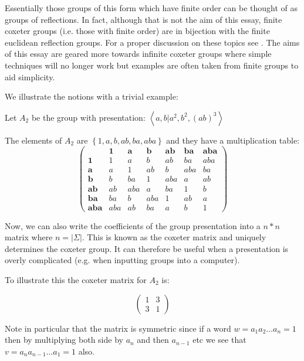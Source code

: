 \documentclass[a4paper,12pt]{article}
\begin{document}
Essentially those groups of this form which have finite order can be thought of as groups of reflections. In fact, although that is not the aim of this essay, finite coxeter groups (i.e. those with finite order) are in bijection with the finite euclidean reflection groups. For a proper discussion on these topics see \cite{humphreys90}. The aims of this essay are geared more towards infinite coxeter groups where simple techniques will no longer work but examples are often taken from finite groups to aid simplicity.

We illustrate the notions with a trivial example:

\begin{example}
Let $A_2$ be the group with presentation: $\left\langle a, b | a^2, b^2, (ab)^3\right\rangle$

The elements of $A_2$ are $\left\{1, a, b, ab, ba, aba\right\}$ and they have a multiplication table:
\[ \left( \begin{array}{ccccccc}
	    & \textbf{1}   & \textbf{a}   & \textbf{b}   & \textbf{ab}  & \textbf{ba}  & \textbf{aba} \\
	\textbf{1}   & 1   & a   & b   & ab  & ba  & aba \\
	\textbf{a}   & a   & 1   & ab  & b   & aba & ba \\
	\textbf{b}   & b   & ba  & 1   & aba & a   & ab \\
	\textbf{ab}  & ab  & aba & a   & ba  & 1   & b \\
	\textbf{ba}  & ba  & b   & aba & 1   & ab  & a \\
	\textbf{aba} & aba & ab  & ba  & a   & b   & 1
\end{array} \right)\]

Now, we can also write the coefficients of the group presentation into a $n*n$ matrix where $n = \left|\Sigma\right|$. This is known as the coxeter matrix and uniquely determines the coxeter group. It can therefore be useful when a presentation is overly complicated (e.g. when inputting groups into a computer).

To illustrate this the coxeter matrix for $A_2$ is:

\[ \left( \begin{array}{cc}
1 & 3 \\
3 & 1
\end{array} \right) \]

Note in particular that the matrix is symmetric since if a word $w = a_1a_2 \ldots a_n = 1$ then by multiplying both side by $a_n$ and then $a_{n-1}$ etc we see that $v = a_na_{n-1} \ldots a_1 = 1$ also.


\end{example}
\end{document}
